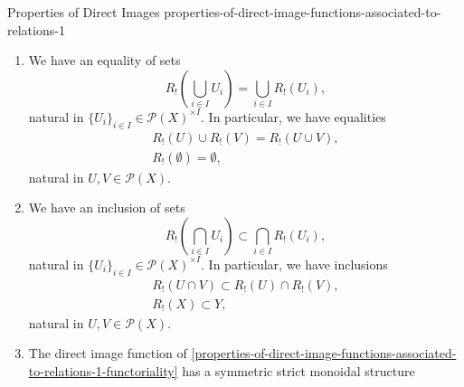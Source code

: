 \begin{proposition}{Properties of Direct Images \rmI}{properties-of-direct-image-functions-associated-to-relations-1}
\begin{enumerate}
\[\begin{tikzcd}[row sep={5.0*\the\DL,between origins}, column sep={11.5*\the\DL,between origins}, background color=backgroundColor, ampersand replacement=\&]
                    {\mathcal{P}(X)^{\op}\times\mathcal{P}(X)}
                    \arrow[r,"R^{\op}_{*}\times R_{!}"]
                    \arrow[d,"{[-_{1},-_{2}]_{X}}"']
                    \&
                    {\mathcal{P}(Y)^{\op}\times\mathcal{P}(Y)}
                    \arrow[d,"{[-_{1},-_{2}]_{Y}}"]
                    \\
                    {\mathcal{P}(X)}
                    \arrow[r,"R_{!}"']
                    \&
                    \mathcal{P}(Y)
                \end{tikzcd}
            \]%
            commutes, i.e.\ we have an equality of sets
            \[
                R_{!}([U,V]_{X})%
                =%
                [R_{*}(U),R_{!}(V)]_{Y},%
            \]%
            natural in $U,V\in\mathcal{P}(X)$.
        \item\label{properties-of-direct-image-functions-associated-to-relations-1-preservation-of-colimits}We have an equality of sets
            \[
                R_{!}\left(\bigcup_{i\in I}U_{i}\right)%
                =%
                \bigcup_{i\in I}R_{!}(U_{i}),%
            \]%
            natural in $\{U_{i}\}_{i\in I}\in\mathcal{P}(X)^{\times I}$. In particular, we have equalities%
            \[
                \begin{gathered}
                    R_{!}(U)\cup R_{!}(V)                  = R_{!}(U\cup V),\\
                    R_{!}(\emptyset)                       = \emptyset,
                \end{gathered}
            \]%
            natural in $U,V\in\mathcal{P}(X)$.
        \item\label{properties-of-direct-image-functions-associated-to-relations-1-oplax-preservation-of-limits}We have an inclusion of sets
            \[
                R_{!}\left(\bigcap_{i\in I}U_{i}\right)%
                \subset%
                \bigcap_{i\in I}R_{!}(U_{i}),%
            \]%
            natural in $\{U_{i}\}_{i\in I}\in\mathcal{P}(X)^{\times I}$. In particular, we have inclusions%
            \[
                \begin{gathered}
                    R_{!}(U\cap V) \subset R_{!}(U)\cap R_{!}(V),\\
                    R_{!}(X)       \subset Y,
                \end{gathered}
            \]%
            natural in $U,V\in\mathcal{P}(X)$.
        \item\label{properties-of-direct-image-functions-associated-to-relations-1-symmetric-strict-monoidality-with-respect-to-unions}The direct image function of \cref{properties-of-direct-image-functions-associated-to-relations-1-functoriality} has a symmetric strict monoidal structure

\end{enumerate}
\end{proposition}

